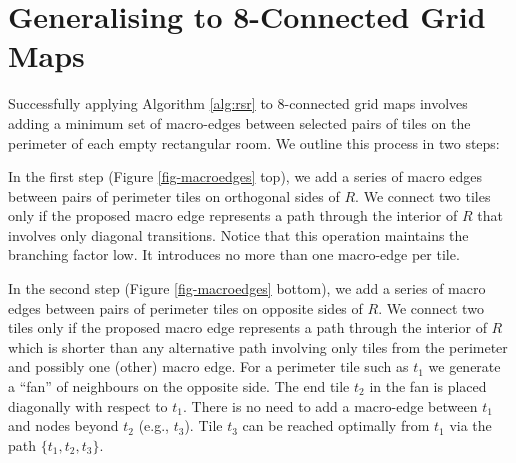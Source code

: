 \section{Generalising to 8-Connected Grid Maps}
Successfully applying Algorithm \ref{alg:rsr} to 8-connected grid maps 
involves adding a minimum set of macro-edges between selected pairs of 
tiles on the perimeter of each empty rectangular room. 
We outline this process in two steps: 
\par
In the first step (Figure \ref{fig-macroedges} top), we add a series of macro 
edges between pairs of perimeter tiles on orthogonal sides of $R$. 
We connect two tiles only if the proposed macro edge represents a path through the interior of $R$ that involves
only diagonal transitions. Notice that this operation maintains the branching factor low.
It introduces no more than one macro-edge per tile.
\par
In the second step (Figure \ref{fig-macroedges} bottom), we add a series of macro 
edges between pairs of perimeter tiles on opposite sides of $R$.
We connect two tiles only if the proposed macro edge represents a path through the interior of $R$ which is shorter
than any alternative path involving only tiles from the perimeter and possibly one (other) macro edge.
For a perimeter tile such as $t_1$ we generate a ``fan'' of neighbours on the opposite side. The end tile $t_2$
in the fan is placed diagonally with respect to $t_1$. There is no need to add a macro-edge between $t_1$
and nodes beyond $t_2$ (e.g., $t_3$). Tile $t_3$ can be reached optimally from $t_1$ via the path
$\lbrace t_1, t_2, t_3 \rbrace$.

